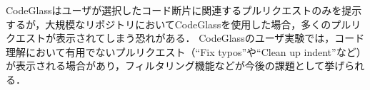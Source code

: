 CodeGlassはユーザが選択したコード断片に関連するプルリクエストのみを提示するが，大規模なリポジトリにおいてCodeGlassを使用した場合，多くのプルリクエストが表示されてしまう恐れがある．
CodeGlassのユーザ実験では，コード理解において有用でないプルリクエスト（``Fix typos''や``Clean up indent''など）が表示される場合があり，フィルタリング機能などが今後の課題として挙げられる．

